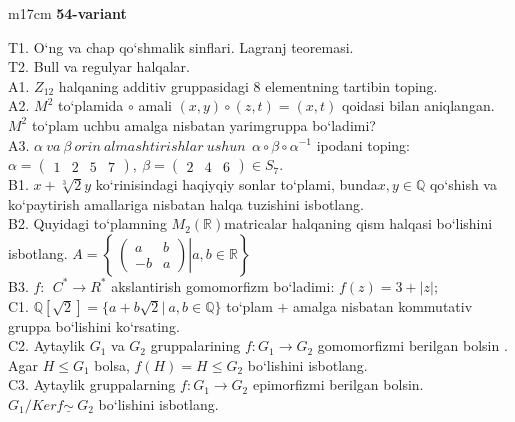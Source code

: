\documentclass{article}
\begin{document}
\begin{tabular}{m{17cm}}
\textbf{54-variant}
\newline

T1. O`ng va chap qo`shmalik sinflari. Lagranj teoremasi. \\
T2. Bull va regulyar halqalar. \\
A1. \(Z_{12}\) halqaning additiv gruppasidagi 8 elementning tartibin toping. \\
A2. \(M^{2}\) to`plamida \(\circ\) amali \((x,y) \circ (z,t) = (x,t)\) qoidasi bilan aniqlangan. \(M^{2}\) to`plam uchbu amalga nisbatan yarimgruppa bo`ladimi? \\
A3. \(\alpha\ va\ \beta\ orin\ almashtirishlar\ ushun\ \ \alpha \circ \beta \circ \alpha^{- 1}\) ipodani toping:\(\alpha = \begin{pmatrix}
1 & 2 & 5 & 7
\end{pmatrix},\ \beta = \begin{pmatrix}
2 & 4 & 6
\end{pmatrix} \in S_{7}\). \\
B1. \(x + \sqrt[3]{2}y\) ko`rinisindagi haqiyqiy sonlar to`plami, bunda\(x,y\mathbb{\in Q}\) qo`shish va ko`paytirish amallariga nisbatan halqa tuzishini isbotlang. \\
B2. Quyidagi to`plamning \(M_{2}(\mathbb{R})\)matricalar halqaning qism halqasi bo`lishini isbotlang. \(A = \left\{ \left. \ \begin{pmatrix}
a & b \\
 - b & a
\end{pmatrix} \right|a,b\mathbb{\in R} \right\}\) \\
B3. \(f:\ \ C^{*} \rightarrow R^{*}\) akslantirish gomomorfizm bo`ladimi: \(f(z) = 3 + |z|;\) \\
C1. \(\mathbb{Q}\left\lbrack \sqrt{2} \right\rbrack = \{ a + b\sqrt{2}|\ a,b\mathbb{\in Q}\}\) to`plam \(+\) amalga nisbatan kommutativ gruppa bo`lishini ko`rsating. \\
C2. Aytaylik \(G_{1}\) va \(G_{2}\) gruppalarining \(f:G_{1} \rightarrow G_{2}\) gomomorfizmi berilgan bo\textquotesingle lsin . Agar \(H \leq G_{1}\) bolsa, \(f(H) = H \leq G_{2}\) bo`lishini isbotlang. \\
C3. Aytaylik gruppalarning \(f:G_{1} \rightarrow G_{2}\) epimorfizmi berilgan bo\textquotesingle lsin. \(G_{1}/Kerf\underline{\sim}\ G_{2}\) bo`lishini isbotlang. \\

\end{tabular}
\vspace{1cm}
\end{document}
